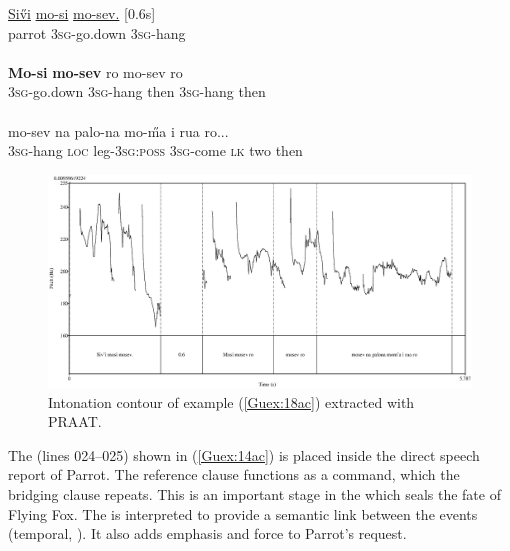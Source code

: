 \documentclass[output=paper]{LSP/langsci}
\begin{document}
\begin{exe}
\ex \label{Guex:18ac}
\begin{xlist}
\ex \label{Guex:18a}
\gll \underline{Si\H{v}i}  \underline{mo-si}           \underline{mo-sev.}           [0.6s]\\
parrot  \textsc{3sg}-go.down   \textsc{3sg}-hang \\
\glt {}\\
\ex \label{Guex:18b}
\gll \textbf{Mo-si}          \textbf{mo-sev}       ro              mo-sev       ro\\
\textsc{3sg}-go.down   \textsc{3sg}-hang   then  \textsc{3sg}-hang then\\
\glt {}\\
\ex \label{Guex:18c}
\gll   mo-sev    na     palo-na           mo-\H{m}a        i     rua   ro...\\     	       
\textsc{3sg}-hang  \textsc{loc}    leg-\textsc{3sg:poss}   \textsc{3sg}-come  \textsc{lk}   two   then \\
\glt {} 
\end{xlist}
\end{exe}

\begin{figure}[ht]
\includegraphics[width=\textwidth]{figures/guerinFig7.eps}
\caption{Intonation contour of example (\ref{Guex:18ac}) extracted with PRAAT. \label{GuF7}}
\end{figure}

The  (lines 024--025) shown in (\ref{Guex:14ac}) is placed inside the direct speech report of Parrot. The reference clause functions as a command, which the bridging clause repeats. This is an important stage in the  which seals the fate of Flying Fox. The  is interpreted to provide a semantic link between the events (temporal, ). It also adds emphasis and force to Parrot’s request. 
\end{document}
